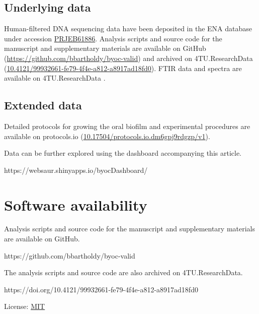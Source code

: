 \documentclass[10pt,a4paper]{article}
\begin{document}
\subsection*{Underlying data}\label{underlying-data}

Human-filtered DNA sequencing data have been deposited in the ENA
database under accession
\href{https://www.ebi.ac.uk/ena/browser/view/PRJEB61886}{PRJEB61886}.
Analysis scripts and source code for the manuscript and supplementary
materials are available on GitHub
(\url{https://github.com/bbartholdy/byoc-valid}) and archived on
4TU.ResearchData
(\href{https://doi.org/10.4121/99932661-fe79-4f4e-a812-a8917ad18fd0}{10.4121/99932661-fe79-4f4e-a812-a8917ad18fd0}).
FTIR data and spectra are available on 4TU.ResearchData
\citep[\href{https://doi.org/10.4121/466b2588-9689-4d84-a8a0-5216aa39e40b}{10.4121/466b2588-9689-4d84-a8a0-5216aa39e40b},][]{byocValidData2023}.

\subsection*{Extended data}\label{extended-data}

Detailed protocols for growing the oral biofilm and experimental
procedures are available on protocols.io
(\href{https://dx.doi.org/10.17504/protocols.io.dm6gpj9rdgzp/v1}{10.17504/protocols.io.dm6gpj9rdgzp/v1}).

Data can be further explored using the dashboard accompanying this
article.

https://websaur.shinyapps.io/byocDashboard/

\section*{Software availability}\label{software-availability}

Analysis scripts and source code for the manuscript and supplementary
materials are available on GitHub.

https://github.com/bbartholdy/byoc-valid

The analysis scripts and source code are also archived on
4TU.ResearchData.

https://doi.org/10.4121/99932661-fe79-4f4e-a812-a8917ad18fd0

License: \href{https://opensource.org/license/MIT}{MIT}
\end{document}
